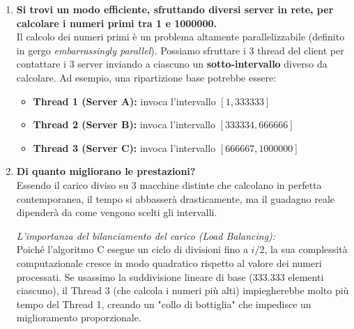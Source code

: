 \documentclass[11pt]{article}
\begin{document}
\begin{tcolorbox}[colback=green!5!white,colframe=green!75!black,title=\textbf{RISPOSTA}, breakable]
\begin{enumerate}
    \item \textbf{Si trovi un modo efficiente, sfruttando diversi server in rete, per calcolare i numeri primi tra 1 e 1000000.}\\
    Il calcolo dei numeri primi è un problema altamente parallelizzabile (definito in gergo \textit{embarrassingly parallel}). Possiamo sfruttare i 3 thread del client per contattare i 3 server inviando a ciascuno un \textbf{sotto-intervallo} diverso da calcolare. Ad esempio, una ripartizione base potrebbe essere:
    \begin{itemize}
        \item \textbf{Thread 1 (Server A):} invoca l'intervallo $[1, 333333]$
        \item \textbf{Thread 2 (Server B):} invoca l'intervallo $[333334, 666666]$
        \item \textbf{Thread 3 (Server C):} invoca l'intervallo $[666667, 1000000]$
    \end{itemize}

    \item \textbf{Di quanto migliorano le prestazioni?}\\
    Essendo il carico diviso su 3 macchine distinte che calcolano in perfetta contemporanea, il tempo si abbasserà drasticamente, ma il guadagno reale dipenderà da come vengono scelti gli intervalli.

    \textit{L'importanza del bilanciamento del carico (Load Balancing):}\\
    Poiché l'algoritmo C esegue un ciclo di divisioni fino a $i/2$, la sua complessità computazionale cresce in modo quadratico rispetto al valore dei numeri processati. Se usassimo la suddivisione lineare di base (333.333 elementi ciascuno), il Thread 3 (che calcola i numeri più alti) impiegherebbe molto più tempo del Thread 1, creando un "collo di bottiglia" che impedisce un miglioramento proporzionale.


\end{enumerate}
\end{tcolorbox}
\end{document}
